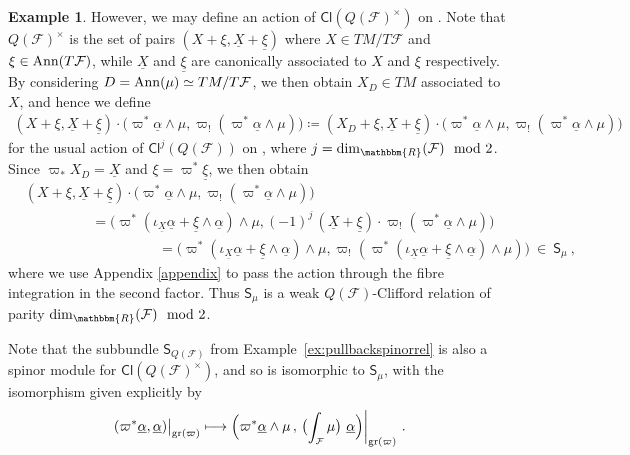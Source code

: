 \documentclass[a4paper, reqno, 11pt]{amsart}
\numberwithin{equation}{section}
\theoremstyle{definition}
\newtheorem{example}[equation]{Example}
\newcommand{\red}[1]{\underline{#1}}
\newcommand{\IR}{\mathbbm{R}}
\newcommand{\Cl}{\mathsf{Cl}}
\newcommand{\cQ}{{\mathcal Q}}
\newcommand{\cF}{{\mathcal F}}
\newcommand{\sfS}{{\mathsf{S}}}
\newcommand{\midwedge}{\text {\Large$\wedge$}}
\newcommand{\gr}{\text{gr}}
\theoremstyle{remark}
\begin{document}
\begin{example}
    However, we may define an action of $\Cl(Q(\cF)^\times)$ on \smash{$\bigl( \midwedge^\bullet T^*M \times \midwedge^\bullet T^*\cQ\bigr) \big \rvert_{\gr(\varpi)}$}. Note that $Q(\cF) ^\times $ is the set of pairs $ (X+\xi, \red X + \red \xi)$ where $X \in TM / T\cF$ and $\xi \in {\rm Ann}(T\cF)$, while $\red X$ and $\red \xi$ are canonically associated to $X$ and $\xi $ respectively. By considering $D = {\rm Ann}(\mu) \simeq TM / T\cF$, we then obtain $X_D \in TM$ associated to $X$, and hence we define
    \begin{align}\label{eqn:Qweakaction}
        (X + \xi, \red X+ \red \xi) \cdot\big(\varpi^* \red\alpha \wedge \mu, \varpi_!(\varpi^* \red\alpha \wedge \mu)\big) \coloneqq (X_D + \xi, \red X+ \red \xi)\cdot\big( \varpi^* \red\alpha \wedge \mu,  \varpi_!(\varpi^* \red\alpha \wedge \mu)\big)
    \end{align}
    for the usual action of $\Cl^j(Q(\cF))$ on \smash{$\bigl( \midwedge^\bullet T^*M \times \midwedge^\bullet T^*\cQ\bigr) \big \rvert_{\gr(\varpi)}$}, where $j = {\rm dim}_\IR(\cF) \mod 2$. Since $\varpi_* X_D = \red X$ and $\xi = \varpi^*\red\xi$, we then obtain
    \begin{align}
       & (X + \xi, \red X+ \red \xi) \cdot\big(\varpi^* \red\alpha \wedge \mu, \varpi_!(\varpi^* \red\alpha \wedge \mu)\big) \\[4pt]
       & \hspace{2cm} = \big(\varpi^*(\iota_{\red X}\red\alpha+\red\xi\wedge \red\alpha) \wedge \mu, (-1)^j\,(\red X + \red \xi)\cdot \varpi_!( \varpi^* \red\alpha \wedge \mu)\big) \\[4pt]
        & \hspace{4cm} =\big(\varpi^*(\iota_{\red X}\red\alpha+\red\xi\wedge \red\alpha) \wedge \mu, \varpi_!(\varpi^*(\iota_{\red X}\red\alpha + \red\xi \wedge \red\alpha) \wedge \mu)\big) \ \in \  \sfS_\mu \ ,
    \end{align}
    where we use Appendix \ref{appendix} to pass the action through the fibre integration in the second factor. Thus $\sfS_\mu$ is a weak $Q(\cF)$-Clifford relation of parity ${\rm dim}_\IR(\cF) \mod 2$. 
    
    Note that the subbundle $\sfS_{Q(\cF)}$ from Example~\ref{ex:pullbackspinorrel} is also a spinor module for $\Cl(Q(\cF)^\times)$, and so is isomorphic to $\sfS_\mu$, with the isomorphism given explicitly by
    \begin{align}
        (\varpi^*\red\alpha , \red\alpha) \big\rvert_{\gr(\varpi)} \longmapsto \Big( \varpi^* \red\alpha \wedge \mu\,,\, \big(\text{\footnotesize{$\int_\cF$}}\, \mu\big)\ \red\alpha \Big) \bigg\rvert_{\gr(\varpi)}\ .
    \end{align}
\end{example}
\end{document}
